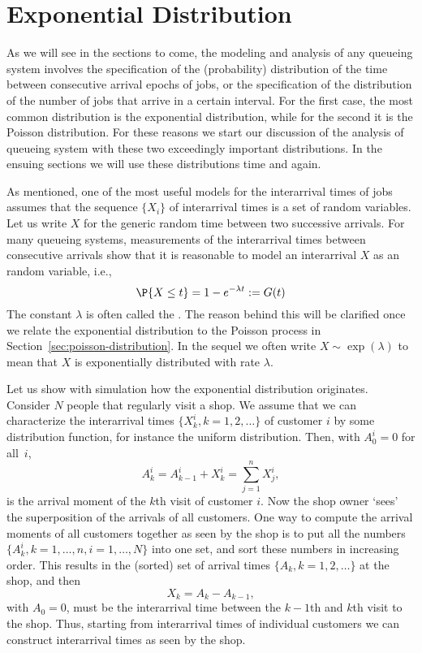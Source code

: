 
\section{Exponential Distribution}
\label{sec:expon-distr}
As we will see in the sections to come, the modeling and analysis of
any queueing system involves the specification of the (probability)
distribution of the time between consecutive arrival epochs of jobs,
or the specification of the distribution of the number of jobs that
arrive in a certain interval.  For the first case, the most common
distribution is the exponential distribution, while for the second it
is the Poisson distribution.  For these reasons we start our
discussion of the analysis of queueing system with these two
exceedingly important distributions. In the ensuing sections we will
use these distributions time and again.

As mentioned, one of the most useful models for the interarrival
times of jobs assumes that the sequence $\{X_i\}$ of interarrival
times is a set of   random variables.  Let us write $X$ for the generic
random time between two successive arrivals. For many queueing
systems, measurements of the interarrival times between consecutive
arrivals show that it is reasonable to model an interarrival $X$ as
an  random variable, i.e.,
\begin{equation*}
  \P{X \leq t} = 1- e^{-\lambda t} := G(t)
\end{equation*}
The constant $\lambda$ is often called the . The reason
behind this will be clarified once we relate the exponential
distribution to the Poisson process in
Section~\ref{sec:poisson-distribution}.  In the sequel we often write
$X\sim \exp(\lambda)$ to mean that $X$ is exponentially distributed
with rate $\lambda$.


Let us show with simulation how the exponential distribution
originates. Consider $N$ people that regularly visit a shop. We assume
that we can characterize the interarrival times
$\{X_k^i, k=1,2, \ldots\}$ of customer $i$ by some distribution
function, for instance the uniform distribution. Then, with
$A_{0}^i=0$ for all~$i$,
\begin{equation*}
A_k^i = A_{k-1}^i + X_k^i = \sum_{j=1}^n X_j^i,
\end{equation*}
is the arrival moment of the $k$th visit of customer $i$.  Now the
shop owner `sees' the superposition of the arrivals of all
customers. One way to compute the arrival moments of all customers
together as seen by the shop is to put all the numbers
$\{A_k^i, k=1,\ldots,n, i=1,\ldots,N\}$ into one set, and sort these
numbers in increasing order. This results in the (sorted) set of
arrival times $\{A_k, k=1,2,\ldots\}$ at the shop, and then
\begin{equation*}
X_k = A_k - A_{k-1},
\end{equation*}
with $A_0=0$, must be the interarrival time between the $k-1$th and
$k$th visit to the shop.  Thus, starting from interarrival times of
individual customers we can construct interarrival times as seen by
the shop.

